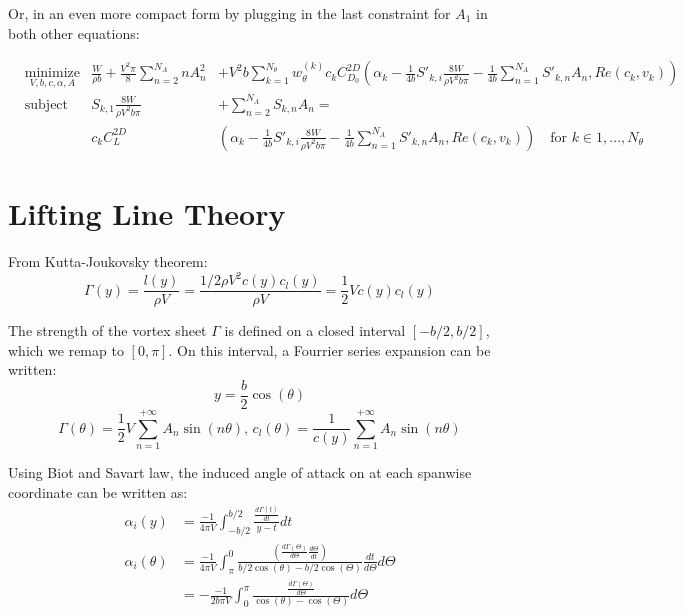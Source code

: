\documentclass[letterpaper,12pt]{article}
\begin{document}
Or, in an even more compact form by plugging in the last constraint for $A_1$ in both other equations:

\begin{align*}
	& \underset{V, b, c, \alpha, A}{\text{minimize}} &
	\frac{W}{\rho b} + \frac{V^2 \pi}{8}\sum_{n=2}^{N_A} n A_{n}^2 &+
	  V^2 b  \sum_{k=1}^{N_{\theta}} w_{\theta}^{(k)} c_k C_{D_0}^{2D}
	  \left( \alpha_k
	  - \frac {1}{4b} S'_{k,i}\frac{8W}{\rho V^2 b \pi}
	  - \frac {1}{4b}\sum_{n=1}^{N_{A}}S'_{k,n}A_n , Re(c_k, v_k)
	  \right)\\
	& \text{subject to} &
 	S_{k, 1} \frac{8W}{\rho V^2 b \pi} &+ \sum_{n=2}^{N_{A}} S_{k,n} A_n = \\
	& & c_kC_L^{2D} & \left( \alpha_k
		 - \frac {1}{4b} S'_{k,i}\frac{8W}{\rho V^2 b \pi}
		 - \frac {1}{4b}\sum_{n=1}^{N_{A}}S'_{k,n}A_n , Re(c_k, v_k)\right)
		 \quad \text{for } k \in 1,\dots, N_{\theta}
\end{align*}

\section{Lifting Line Theory}

From Kutta-Joukovsky theorem:
%
$$\Gamma(y) = \frac{l(y)}{\rho V} = \frac{1/2 \rho V^2 c(y) c_l(y)}{\rho V} =  \frac{1}{2} V c(y) c_l(y)$$

The strength of the vortex sheet $\Gamma$ is defined on a closed interval $[-b/2, b/2]$, which we remap to $[0, \pi]$. 
On this interval, a Fourrier series expansion can be written:
$$y = \frac{b}{2}\cos(\theta)$$
%
$$\Gamma(\theta) = \frac{1}{2} V\sum_{n=1}^{+\infty} A_n \sin(n\theta) \text{,      } c_l(\theta) = \frac 1 {c(y)} \sum_{n=1}^{+\infty} A_n \sin(n\theta)$$

Using Biot and Savart law, the induced angle of attack on at each spanwise coordinate can be written as:
%
	\begin{align*}
		\alpha_i(y) &= \frac{-1}{4\pi V}\int_{-b/2}^{b/2} \frac{\frac{d\Gamma(t)}{dt}}{y-t} dt \\ 
		\alpha_i(\theta) &= \frac{-1}{4\pi V} \int_{\pi}^{0} \frac{\left( \frac{d\Gamma(\Theta)}{d\Theta} \frac{d\Theta}{dt}\right)}{b/2\cos(\theta)-b/2\cos(\Theta)}\frac{dt}{d\Theta} d\Theta	 \\
				 &= -\frac{-1}{2b\pi V} \int_{0}^{\pi} \frac{\frac{d\Gamma(\Theta)}{d\Theta}}{\cos(\theta)-\cos(\Theta)} d\Theta	
	\end{align*}
\end{document}

